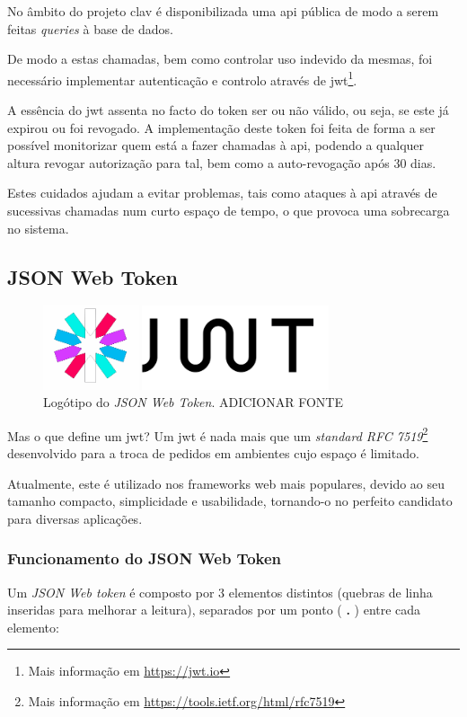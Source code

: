 No âmbito do projeto \gls{clav} é disponibilizada uma \gls{api} pública de modo a serem feitas \emph{queries} à base de dados.

De modo a estas chamadas, bem como controlar uso indevido da mesmas, foi necessário implementar autenticação e controlo através de \gls{jwt}\footnote{Mais informação em \url{https://jwt.io}}.

A essência do \gls{jwt} assenta no facto do token ser ou não válido, ou seja, se este já expirou ou foi revogado. A implementação deste token foi feita de forma a ser possível monitorizar quem está a fazer chamadas à \gls{api}, podendo a qualquer altura revogar autorização para tal, bem como a auto-revogação após 30 dias.

Estes cuidados ajudam a evitar problemas, tais como ataques à \gls{api} através de sucessivas chamadas num curto espaço de tempo, o que provoca uma sobrecarga no sistema.

\subsection{JSON Web Token}

\begin{figure}[h]
    \centering
    \includegraphics[width=0.75\textwidth]{img/jwt/jwtlogo.png}
    \caption{Logótipo do \emph{JSON Web Token}. ADICIONAR FONTE}
\end{figure}

Mas o que define um \gls{jwt}? Um \gls{jwt} é nada mais que um \emph{standard RFC 7519}\footnote{Mais informação em \url{https://tools.ietf.org/html/rfc7519}} desenvolvido para a troca de pedidos em ambientes cujo espaço é limitado. 

Atualmente, este é utilizado nos frameworks web mais populares, devido ao seu tamanho compacto, simplicidade e usabilidade, tornando-o no perfeito candidato para diversas aplicações.

\cleardoublepage
\subsubsection{Funcionamento do JSON Web Token}

Um \emph{JSON Web token} é composto por 3 elementos distintos (quebras de linha inseridas para melhorar a leitura), separados por um ponto (\textbf{ . }) entre cada elemento:

